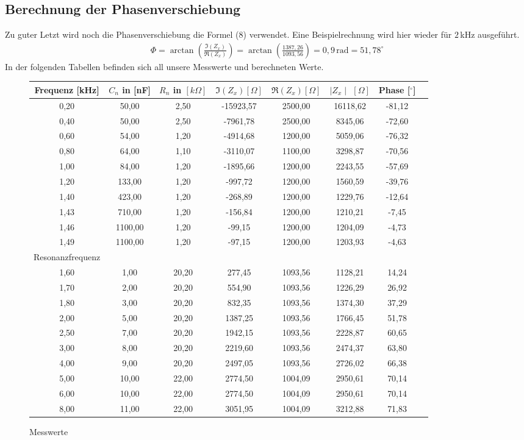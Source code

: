 \documentclass[fontsize=12pt]{scrartcl}
\begin{document}
\subsection{Berechnung der Phasenverschiebung}
Zu guter Letzt wird noch die Phasenverschiebung die Formel (8) verwendet.
Eine Beispielrechnung wird hier wieder für $2\,$kHz ausgeführt.  
\begin{align*}
\Phi = \arctan(\frac{\Im(Z_{x})}{\Re(Z_{x})}) = \arctan(\frac{1387,26}{1093,56}) =0,9\,{\text{rad}}=51,78^{\circ}
\end{align*}
\noindent
In der folgenden Tabellen befinden sich all unsere Messwerte und berechneten Werte.
\begin{figure}[h]
\vspace{-10pt}
\centering
\caption{Messwerte}
\begin{tabular}{|c|c|c|c|c|c|c|c|} \hline
Frequenz [kHz]	&$C_n$ in [nF]& $R_n$ in $[k\Omega]$ & $\Im(Z_x) [\Omega]$ & $
\Re(Z_x) [\Omega]$ & $\mid Z_x\mid$ $[\Omega]$& Phase [$^{\circ}$]  \\ 
\hline	
0,20&	50,00		&2,50		&-15923,57		&2500,00	&16118,62 	&-81,12\\ \hline	
0,40&	50,00		&2,50		&-7961,78		&2500,00	&8345,06	&-72,60\\ \hline	
0,60&	54,00		&1,20		&-4914,68		&1200,00	&5059,06	&-76,32\\ \hline	
0,80&	64,00		&1,10		&-3110,07		&1100,00		&3298,87	&-70,56\\ \hline	
1,00&	84,00		&1,20		&-1895,66		&1200,00	&2243,55	&-57,69\\ \hline	
1,20&	133,00		&1,20		&-997,72			&1200,00	&1560,59	&-39,76\\ \hline	
1,40&	423,00		&1,20		&-268,89			&1200,00	&1229,76	&-12,64\\ \hline	
1,43&	710,00		&1,20		&-156,84			&1200,00	&1210,21	&-7,45\\ \hline	
1,46&	1100,00	&1,20		&-99,15			&1200,00	&1204,09	&-4,73\\ \hline	
1,49&	1100,00	&1,20		&-97,15			&1200,00	&1203,93	&-4,63\\ \hline	
\multicolumn{1}{c}{Resonanzfrequenz} \\ \hline
1,60&	1,00		&20,20	&277,45			&1093,56	&1128,21	&14,24\\ \hline	
1,70&	2,00		&20,20	&554,90			&1093,56	&1226,29	&26,92\\ \hline	
1,80&	3,00		&20,20	&832,35			&1093,56	&1374,30	&37,29\\ \hline	
2,00&	5,00		&20,20	&1387,25		&1093,56	&1766,45	&51,78\\ \hline	
2,50&	7,00		&20,20	&1942,15		&1093,56	&2228,87	&60,65\\ \hline	
3,00&	8,00		&20,20	&2219,60		&1093,56	&2474,37	&63,80\\ \hline	
4,00&	9,00		&20,20	&2497,05		&1093,56	&2726,02	&66,38\\ \hline	
5,00&	10,00		&22,00	&2774,50		&1004,09	&2950,61	&70,14\\ \hline	
6,00&	10,00		&22,00	&2774,50		&1004,09	&2950,61	&70,14\\ \hline	
8,00&	11,00		&22,00	&3051,95		&1004,09	&3212,88	&71,83\\ \hline	
\end{tabular} 
\end{figure}
\end{document}
